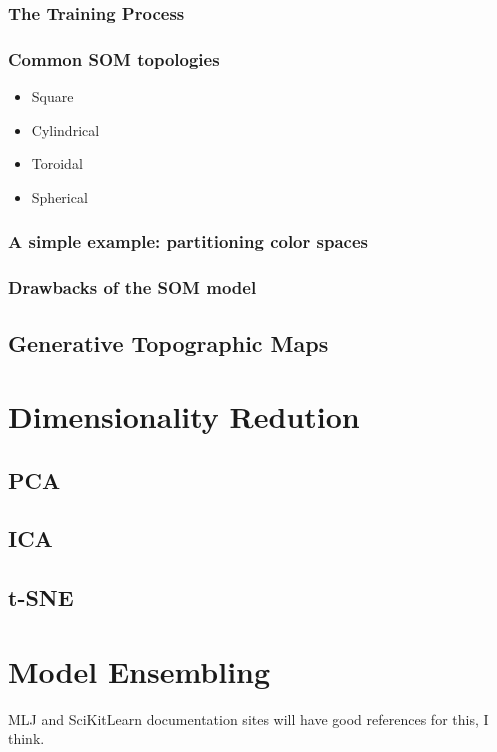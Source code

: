\subsubsection{The Training Process}

\subsubsection{Common SOM topologies}
\begin{itemize}
\item Square
\item Cylindrical
\item Toroidal
\item Spherical
\end{itemize}

\subsubsection{A simple example: partitioning color spaces}
\subsubsection{Drawbacks of the SOM model}


\subsection{Generative Topographic Maps}



\section{Dimensionality Redution}
\subsection{PCA}
\subsection{ICA}
\subsection{t-SNE}



\section{Model Ensembling}
MLJ and SciKitLearn documentation sites will have good references for this, I think.
